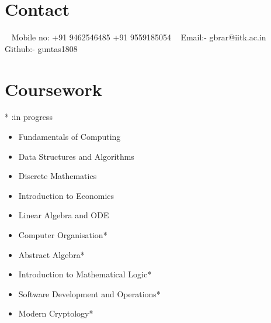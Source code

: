 \documentclass[]{style}          %
\begin{document}


\begin{aside} \begin{flushleft} \section{Contact}
    ~
    Mobile no:
    +91 9462546485
    +91 9559185054
    ~
    Email:-
    gbrar@iitk.ac.in
    ~
    Github:-
    guntas1808
    ~
\section{Coursework}
    {\vspace{-0.2cm}} \begin{entrylist}
    {\vspace{-0.5cm}}
    \entry
      {* :in progress}
      {\begin{itemize}[leftmargin=*]
          \item Fundamentals
          of Computing 
          {\vspace{+0.12cm}}
          \item Data Structures
          and Algorithms
          {\vspace{+0.12cm}}
          \item Discrete
          Mathematics
         {\vspace{+0.12cm}}
         \item Introduction to 
          Economics
         {\vspace{+0.12cm}}
          \item Linear Algebra 
          and ODE
         {\vspace{+0.12cm}}
          \item Computer 
          Organisation*
            {\vspace{+0.12cm}}
          \item Abstract Algebra*
          {\vspace{+0.12cm}}
          \item Introduction to 
          Mathematical Logic*
          {\vspace{+0.12cm}}
          \item Software 
          Development 
          and Operations*
          {\vspace{+0.12cm}}
          \item Modern Cryptology*
      \end{itemize}} 
    \end{entrylist}
    {\vspace{-0.7cm}}

\end{flushleft}
\end{aside}
\end{document}

